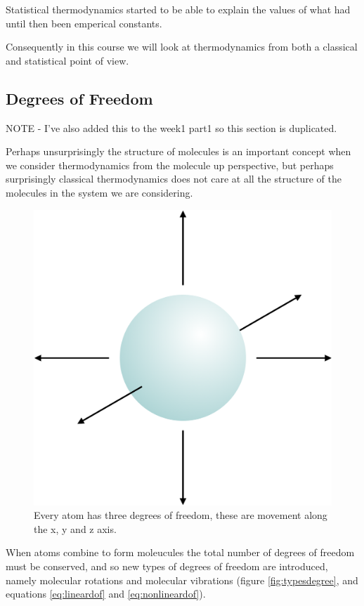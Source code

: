 \documentclass[
]{book}
\begin{document}
Statistical thermodynamics started to be able to explain the values of what had until then been emperical constants.

Consequently in this course we will look at thermodynamics from both a classical and statistical point of view.

\hypertarget{degrees-of-freedom}{%
\subsection{Degrees of Freedom}\label{degrees-of-freedom}}

NOTE - I've also added this to the week1 part1 so this section is duplicated.

Perhaps unsurprisingly the structure of molecules is an important concept when we consider thermodynamics from the molecule up perspective, but perhaps surprisingly classical thermodynamics does not care at all the structure of the molecules in the system we are considering.

\begin{figure}

{\centering \includegraphics[width=0.8\linewidth]{images/atomdegrees} 

}

\caption{Every atom has three degrees of freedom, these are movement along the x, y and z axis.}\label{fig:atomdegrees}
\end{figure}

When atoms combine to form moleucules the total number of degrees of freedom must be conserved, and so new types of degrees of freedom are introduced, namely molecular rotations and molecular vibrations (figure \ref{fig:typesdegree}, and equations \eqref{eq:lineardof} and \eqref{eq:nonlineardof}).
\end{document}
